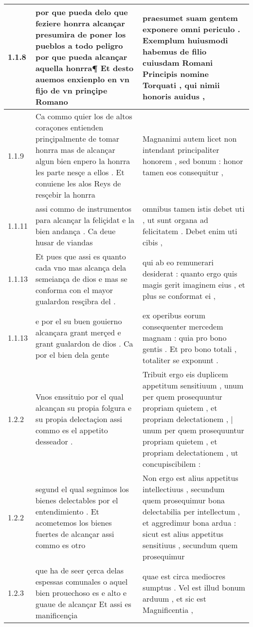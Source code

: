 \begin{tabular}{|p{1cm}|p{6.5cm}|p{6.5cm}|}
1.1.8 & por que pueda delo que feziere honrra alcançar presumira de poner los pueblos a todo peligro por que pueda alcançar aquella honrra¶ Et desto auemos enxienplo en vn fijo de vn prinçipe Romano & praesumet suam gentem exponere omni periculo . Exemplum huiusmodi habemus de filio cuiusdam Romani Principis nomine Torquati , qui nimii honoris auidus , \\\hline
1.1.9 & Ca commo quier los de altos coraçones entienden prinçipalmente de tomar honrra mas de alcançar algun bien enpero la honrra les parte nesçe a ellos . Et conuiene les alos Reys de resçebir la honrra & Magnanimi autem licet non intendant principaliter honorem , sed bonum : honor tamen eos consequitur , \\\hline
1.1.11 & assi commo de instrumentos para alcançar la feliçidat e la bien andança . Ca deue husar de viandas & omnibus tamen istis debet uti , ut sunt organa ad felicitatem . Debet enim uti cibis , \\\hline
1.1.13 & Et pues que assi es quanto cada vno mas alcança dela semeiança de dios e mas se conforma con el mayor gualardon resçibra del . & qui ab eo remunerari desiderat : quanto ergo quis magis gerit imaginem eius , et plus se conformat ei , \\\hline
1.1.13 & e por el su buen gouierno alcançara grant merçed e grant gualardon de dios . Ca por el bien dela gente & ex operibus eorum consequenter mercedem magnam : quia pro bono gentis . Et pro bono totali , totaliter se exponunt . \\\hline
1.2.2 & Vnos enssituio por el qual alcançan su propia folgura e su propia delectaçion assi commo es el appetito desseador . & Tribuit ergo eis duplicem appetitum sensitiuum , unum per quem prosequuntur propriam quietem , et propriam delectationem , | unum per quem prosequuntur propriam quietem , et propriam delectationem , ut concupiscibilem : \\\hline
1.2.2 & segund el qual segnimos los bienes delectables por el entendimiento . Et acometemos los bienes fuertes de alcançar assi commo es otro & Non ergo est alius appetitus intellectiuus , secundum quem prosequimur bona delectabilia per intellectum , et aggredimur bona ardua : sicut est alius appetitus sensitiuus , secundum quem prosequimur \\\hline
1.2.3 & que ha de seer çerca delas espessas comunales o aquel bien prouechoso es e alto e guaue de alcançar Et assi es manificençia & quae est circa mediocres sumptus . Vel est illud bonum arduum , et sic est Magnificentia , \\\hline

\end{tabular}
